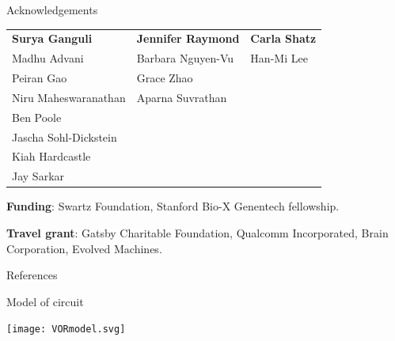 \documentclass{beamer}%
\begin{document}
\begin{frame}{Acknowledgements}
%
 \begin{tabular}{lll}
   \textbf{Surya Ganguli} & \textbf{Jennifer Raymond} & \textbf{Carla Shatz} \\
   Madhu Advani & Barbara Nguyen-Vu & Han-Mi Lee \\
   Peiran Gao & Grace Zhao & \\
   Niru Maheswaranathan & Aparna Suvrathan \\
   Ben Poole \\
   Jascha Sohl-Dickstein \\
   Kiah Hardcastle \\
   Jay Sarkar
 \end{tabular}

 \vp\textbf{Funding}: Swartz Foundation, Stanford Bio-X Genentech fellowship.

 \vp\textbf{Travel grant}: Gatsby Charitable Foundation,
                           Qualcomm Incorporated,
                           Brain Corporation,
                           Evolved Machines.
%
\end{frame}

\appendix
\begin{frame}[allowframebreaks]{References}
%

 {\tiny
 
 
 }
%
\end{frame}


\begin{frame}{Model of circuit}
%
 \begin{center}
   \texttt{[image: VORmodel.svg]}
 \end{center}
%
\end{frame}
\end{document}

